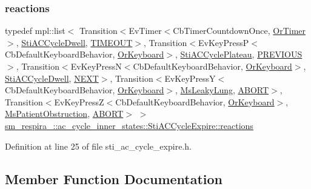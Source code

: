 \subsubsection{\texorpdfstring{reactions}{reactions}}
{\footnotesize\ttfamily typedef mpl\+::list$<$ Transition$<$Ev\+Timer$<$Cb\+Timer\+Countdown\+Once, \hyperlink{classsm__respira__1_1_1OrTimer}{Or\+Timer}$>$, \hyperlink{structsm__respira__1_1_1ac__cycle__inner__states_1_1StiACCycleDwell}{Sti\+A\+C\+Cycle\+Dwell}, \hyperlink{structsm__respira__1_1_1ac__cycle__inner__states_1_1StiACCycleExpire_1_1TIMEOUT}{T\+I\+M\+E\+O\+UT}$>$, Transition$<$Ev\+Key\+PressP$<$Cb\+Default\+Keyboard\+Behavior, \hyperlink{classsm__respira__1_1_1OrKeyboard}{Or\+Keyboard}$>$, \hyperlink{structsm__respira__1_1_1ac__cycle__inner__states_1_1StiACCyclePlateau}{Sti\+A\+C\+Cycle\+Plateau}, \hyperlink{structsm__respira__1_1_1ac__cycle__inner__states_1_1StiACCycleExpire_1_1PREVIOUS}{P\+R\+E\+V\+I\+O\+US}$>$, Transition$<$Ev\+Key\+PressN$<$Cb\+Default\+Keyboard\+Behavior, \hyperlink{classsm__respira__1_1_1OrKeyboard}{Or\+Keyboard}$>$, \hyperlink{structsm__respira__1_1_1ac__cycle__inner__states_1_1StiACCycleDwell}{Sti\+A\+C\+Cycle\+Dwell}, \hyperlink{structsm__respira__1_1_1ac__cycle__inner__states_1_1StiACCycleExpire_1_1NEXT}{N\+E\+XT}$>$, Transition$<$Ev\+Key\+PressY$<$Cb\+Default\+Keyboard\+Behavior, \hyperlink{classsm__respira__1_1_1OrKeyboard}{Or\+Keyboard}$>$, \hyperlink{classsm__respira__1_1_1MsLeakyLung}{Ms\+Leaky\+Lung}, \hyperlink{classABORT}{A\+B\+O\+RT}$>$, Transition$<$Ev\+Key\+PressZ$<$Cb\+Default\+Keyboard\+Behavior, \hyperlink{classsm__respira__1_1_1OrKeyboard}{Or\+Keyboard}$>$, \hyperlink{classsm__respira__1_1_1MsPatientObstruction}{Ms\+Patient\+Obstruction}, \hyperlink{classABORT}{A\+B\+O\+RT}$>$ $>$ \hyperlink{structsm__respira__1_1_1ac__cycle__inner__states_1_1StiACCycleExpire_aed9b816dca6a2dfa6500c2e4678d3784}{sm\+\_\+respira\+\_\+::ac\+\_\+cycle\+\_\+inner\+\_\+states\+::\+Sti\+A\+C\+Cycle\+Expire\+::reactions}}



Definition at line 25 of file sti\+\_\+ac\+\_\+cycle\+\_\+expire.\+h.



\subsection{Member Function Documentation}
\mbox{\label{structsm__respira__1_1_1ac__cycle__inner__states_1_1StiACCycleExpire_a00fafff2c0aaa6195ffbad563c09e9b2}} 
